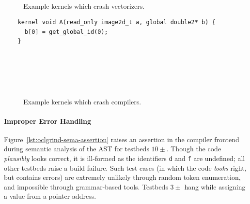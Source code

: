 

\begin{figure}
  \centering
  \\%
  \caption{Example kernels which crash vectorizers.}%
  \label{lst:vectorizer-crashes}%
\end{figure}

\newsavebox{\IntelGtDoubleAssertion}
\begin{lrbox}{\IntelGtDoubleAssertion}
  \hspace{1.5em}
  \begin{lstlisting}
    kernel void A(read_only image2d_t a, global double2* b) {
      b[0] = get_global_id(0);
    }
  \end{lstlisting}
\end{lrbox}

\begin{figure}
  \centering %
  \\%
  \\%
  \\%
  \\%
  \caption{Example kernels which crash compilers.}%
  \label{lst:compiler-crashes}%
\end{figure}

\paragraph{Improper Error Handling} Figure~\ref{lst:oclgrind-sema-assertion} raises an assertion in the compiler frontend during semantic analysis of the AST for testbeds $10\pm$. Though the code \emph{plausibly} looks correct, it is ill-formed as the identifiers \texttt{d} and \texttt{f} are undefined; all other testbeds raise a build failure. Such test cases (in which the code \emph{looks} right, but contains errors) are extremely unlikely through random token enumeration, and impossible through grammar-based tools. Testbeds $3\pm$ hang while assigning a value from a pointer address.


